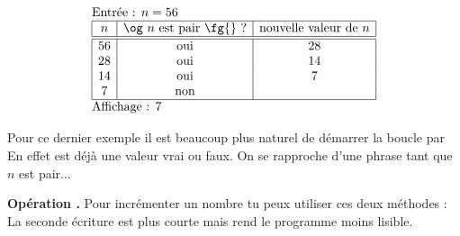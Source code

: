 \documentclass[11pt,class=report,crop=false]{standalone}
\begin{document}
\begin{cours}
\begin{exemple}
\begin{minipage}{0.4\textwidth}
\end{minipage}

  $$
  \begin{array}{l}
  \text{Entrée : $n=56$}    \\
  \begin{array}{|c|c|c|}
  \hline  
  n & \text{\og $n$ est pair \fg{} ?} & \text{nouvelle valeur de } n \\
  \hline\hline 
  56 & \text{oui} & 28 \\
  28 & \text{oui} & 14 \\
  14 & \text{oui} & 7 \\
  7 & \text{non} &  \\ 
  \hline
  \end{array} \\
  \text{Affichage : $7$}  
  \end{array} 
  $$ 
\medskip

Pour ce dernier exemple il est beaucoup plus naturel de démarrer la boucle par
En effet  est déjà une valeur \og{}vrai\fg{} ou \ci{}faux\fg{}.
On se rapproche d'une phrase \og{}tant que $n$ est pair...\fg{}

\end{exemple}


\textbf{Opération \og{}\ci{+=}\fg{}.}
Pour incrémenter un nombre tu peux utiliser ces deux méthodes :
La seconde écriture est plus courte mais rend le programme moins lisible.
\end{cours}
\end{document}
